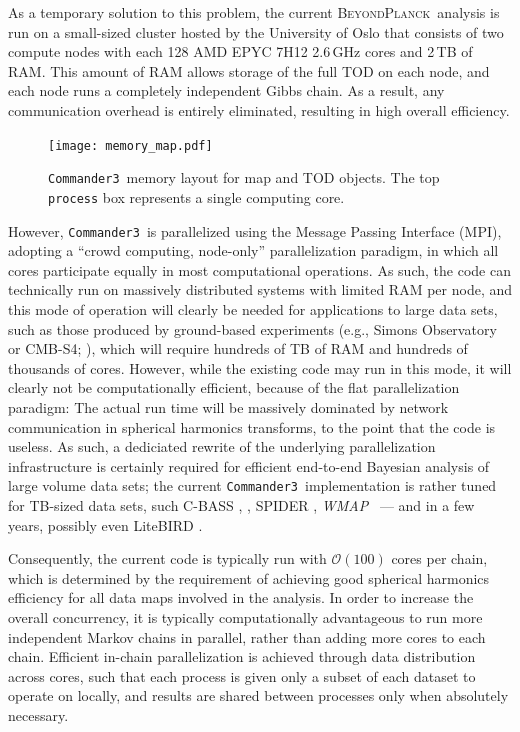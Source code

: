 \documentclass[twocolumn]{aa}
\def\WMAP{\emph{WMAP}}
\def\commanderthree{\texttt{Commander3}}
\newcommand{\BP}{\textsc{BeyondPlanck}}
\begin{document}
As a temporary solution to this problem, the current
\BP\ analysis \citep{BP01} is run on a small-sized cluster hosted by
the University of Oslo that consists of two compute nodes with each
128 AMD EPYC 7H12 2.6\,GHz cores and 2\,TB of RAM. This amount of RAM
allows storage of the full TOD on each node, and each node runs a
completely independent Gibbs chain. As a result, any communication
overhead is entirely eliminated, resulting in high overall efficiency.

\begin{figure}[t]
  \center
  \texttt{[image: memory\_map.pdf]}
  \caption{\commanderthree\ memory layout for map and TOD objects. The
    top \texttt{process} box represents a single computing core. 
  }\label{fig:memory}
\end{figure}

However, \commanderthree\ is parallelized using the Message Passing
Interface (MPI), adopting a ``crowd computing, node-only''
parallelization paradigm, in which all cores participate equally in
most computational operations. As such, the code can technically run
on massively distributed systems with limited RAM per node, and this mode
of operation will clearly be needed for applications to large data sets,
such as those produced by ground-based experiments (e.g., Simons
Observatory or CMB-S4; \citealp{simons,s4}), which will require hundreds of TB of RAM and
hundreds of thousands of cores. However, while the existing code may
run in this mode, it will clearly not be computationally efficient,
because of the flat parallelization paradigm: The actual run time will
be massively dominated by network communication in spherical harmonics
transforms, to the point that the code is useless. As such, a
dediciated rewrite of the underlying parallelization infrastructure is
certainly required for efficient end-to-end Bayesian analysis of large
volume data sets; the current \commanderthree\ implementation is
rather tuned for TB-sized data sets, such C-BASS \citep{cbass}, \Planck, SPIDER \citep{spider},
\WMAP\ \citep{wmap} --- and in a few years, possibly even LiteBIRD \citep{LiteBIRD}.

Consequently, the current code is typically run with
$\mathcal{O}(100)$ cores per chain, which is determined by the
requirement of achieving good spherical harmonics efficiency for all
data maps involved in the analysis. In order to increase the overall
concurrency, it is typically computationally advantageous to run more
independent Markov chains in parallel, rather than adding more cores
to each chain. Efficient in-chain parallelization is achieved through
data distribution across cores, such that each process is given only a
subset of each dataset to operate on locally, and results are shared
between processes only when absolutely necessary.
\end{document}
